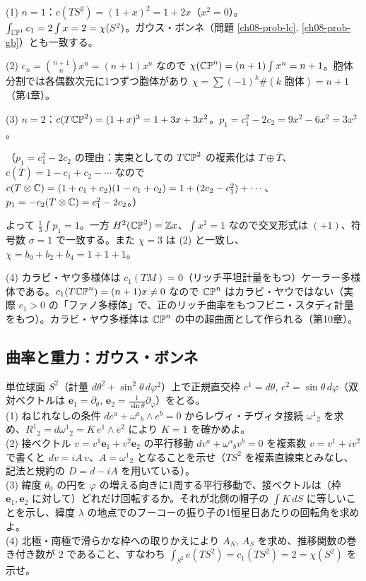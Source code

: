 \begin{solution}
(1) $n=1$：$c(TS^2)=(1+x)^2=1+2x$（$x^2=0$）。$\int_{\mathbb{CP}^1}c_1=2\int x=2=\chi(S^2)$。ガウス・ボンネ（問題 \ref{ch08-prob-lc}, \ref{ch08-prob-gb}）とも一致する。

(2) $c_n=\binom{n+1}{n}x^n=(n+1)x^n$ なので $\chi(\mathbb{CP}^n)=(n+1)\int x^n=n+1$。胞体分割では各偶数次元に1つずつ胞体があり $\chi=\sum(-1)^k\#(k\text{ 胞体})=n+1$（第4章）。

(3) $n=2$：$c(T\mathbb{CP}^2)=(1+x)^3=1+3x+3x^2$。$p_1=c_1^2-2c_2=9x^2-6x^2=3x^2$。

（$p_1=c_1^2-2c_2$ の理由：実束としての $T\mathbb{CP}^2$ の複素化は $T\oplus\bar T$、$c(\bar T)=1-c_1+c_2-\cdots$ なので $c(T\otimes\mathbb{C})=(1+c_1+c_2)(1-c_1+c_2)=1+(2c_2-c_1^2)+\cdots$、$p_1=-c_2(T\otimes\mathbb{C})=c_1^2-2c_2$。）

よって $\frac13\int p_1=1$。一方 $H^2(\mathbb{CP}^2)=\mathbb{Z} x$、$\int x^2=1$ なので交叉形式は $(+1)$、符号数 $\sigma=1$ で一致する。また $\chi=3$ は (2) と一致し、$\chi=b_0+b_2+b_4=1+1+1$。

(4) カラビ・ヤウ多様体は $c_1(TM)=0$（リッチ平坦計量をもつ）ケーラー多様体である。$c_1(T\mathbb{CP}^n)=(n+1)x\ne0$ なので $\mathbb{CP}^n$ はカラビ・ヤウではない（実際 $c_1>0$ の「ファノ多様体」で、正のリッチ曲率をもつフビニ・スタディ計量をもつ）。カラビ・ヤウ多様体は $\mathbb{CP}^{n}$ の中の超曲面として作られる（第10章）。
\end{solution}

\subsection{曲率と重力：ガウス・ボンネ}

\begin{problem}[難易度 C]\label{ch08-prob-lc}
単位球面 $S^2$（計量 $d\theta^2+\sin^2\theta\,d\varphi^2$）上で正規直交枠 $e^1=d\theta$, $e^2=\sin\theta\,d\varphi$（双対ベクトルは $\bm e_1=\partial_\theta$, $\bm e_2=\frac1{\sin\theta}\partial_\varphi$）をとる。\\
(1) ねじれなしの条件 $de^a+\omega^a{}_b\wedge e^b=0$ からレヴィ・チヴィタ接続 $\omega^1{}_2$ を求め、$R^1{}_2=d\omega^1{}_2=K\,e^1\wedge e^2$ により $K=1$ を確かめよ。\\
(2) 接ベクトル $v=v^1\bm e_1+v^2\bm e_2$ の平行移動 $dv^a+\omega^a{}_bv^b=0$ を複素数 $v=v^1+iv^2$ で書くと $dv=iA\,v$、$A=\omega^1{}_2$ となることを示せ（$TS^2$ を複素直線束とみなし、記法と規約の $D=d-iA$ を用いている）。\\
(3) 緯度 $\theta_0$ の円を $\varphi$ の増える向きに1周する平行移動で、接ベクトルは（枠 $\bm e_1,\bm e_2$ に対して）どれだけ回転するか。それが北側の帽子の $\int K\,dS$ に等しいことを示し、緯度 $\lambda$ の地点でのフーコーの振り子の1恒星日あたりの回転角を求めよ。\\
(4) 北極・南極で滑らかな枠への取りかえにより $A_N$, $A_S$ を求め、推移関数の巻き付き数が $2$ であること、すなわち $\int_{S^2}e(TS^2)=c_1(TS^2)=2=\chi(S^2)$ を示せ。
\end{problem}

